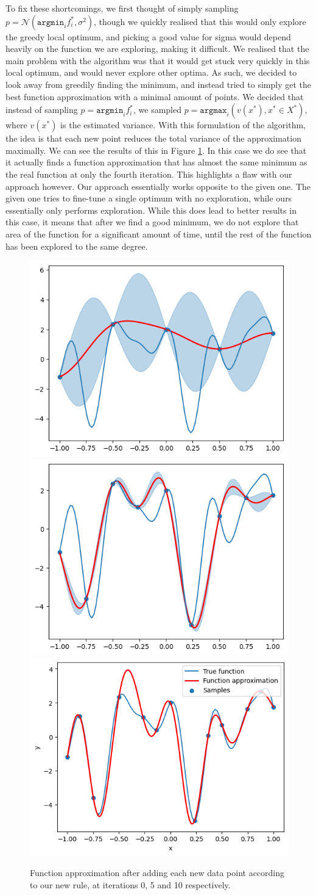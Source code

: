 To fix these shortcomings, we first thought of simply sampling $p = \mathcal{N} \left(\texttt{argmin}_if_i^*, \sigma^2\right)$, though we quickly realised that this would only explore the greedy local optimum, and picking a good value for sigma would depend heavily on the function we are exploring, making it difficult. We realised that the main problem with the algorithm was that it would get stuck very quickly in this local optimum, and would never explore other optima. As such, we decided to look away from greedily finding the minimum, and instead tried to simply get the best function approximation with a minimal amount of points. We decided that instead of sampling $p = \texttt{argmin}_if_i^*$, we sampled $p = \texttt{argmax}_i \left( v(x^*), x^* \in X^* \right)$, where $v(x^*)$ is the estimated variance. With this formulation of the algorithm, the idea is that each new point reduces the total variance of the approximation maximally. We can see the results of this in Figure \ref{fig:iter_new}. In this case we do see that it actually finds a function approximation that has almost the same minimum as the real function at only the fourth iteration. This highlights a flaw with our approach however. Our approach essentially works opposite to the given one. The given one tries to fine-tune a single optimum with no exploration, while ours essentially only performs exploration. While this does lead to better results in this case, it means that after we find a good minimum, we do not explore that area of the function for a significant amount of time, until the rest of the function has been explored to the same degree.

\begin{figure}[H]
\centering
\includegraphics[width=0.3\linewidth]{images/iter_0.png}
\includegraphics[width=0.3\linewidth]{images/iter_4.png}
\includegraphics[width=0.3\linewidth]{images/output.png}
\caption{Function approximation after adding each new data point according to our new rule, at iterations 0, 5 and 10 respectively.}
\label{fig:iter_new}
\end{figure}


